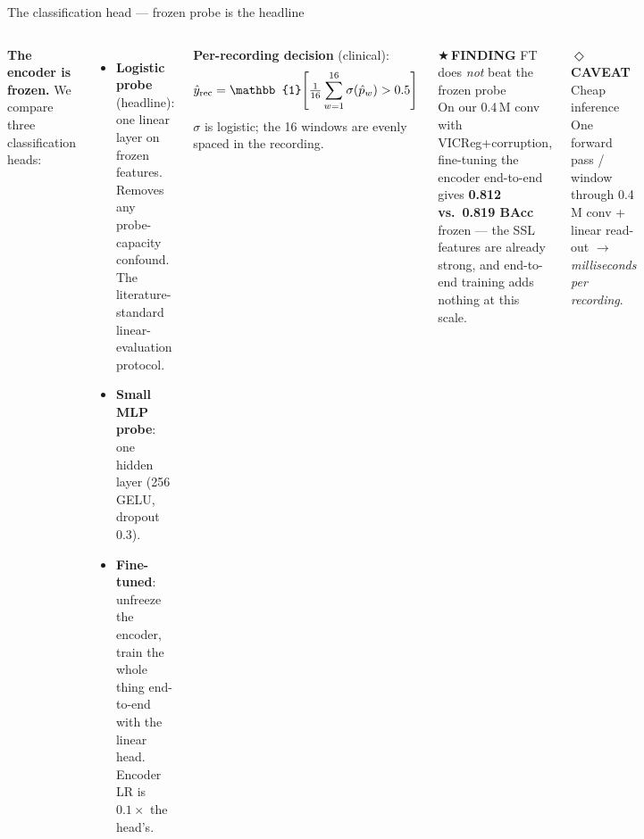 \documentclass[aspectratio=169,11pt]{beamer}
\newcommand{\caveattag}{\textcolor{tplred}{\scriptsize\sffamily\bfseries$\Diamond$\,CAVEAT}\xspace}
\newcommand{\findingtag}{\textcolor{tplgold}{\scriptsize\sffamily\bfseries$\bigstar$\,FINDING}\xspace}
\newcommand{\sectionheader}[1]{\renewcommand{\insertsection}{#1}}
\begin{document}
\sectionheader{INFERENCE}
\begin{frame}{The classification head --- frozen probe is the headline}
\begin{columns}[T,onlytextwidth]
\textbf{The encoder is frozen.} We compare three classification heads:
\begin{itemize}\setlength\itemsep{0pt}
\item \textbf{Logistic probe} (headline): one linear layer on frozen features.
      Removes any probe-capacity confound. The literature-standard
      linear-evaluation protocol.
\item \textbf{Small MLP probe}: one hidden layer (256 GELU, dropout 0.3).
\item \textbf{Fine-tuned}: unfreeze the encoder, train the whole thing
      end-to-end with the linear head. Encoder LR is $0.1\times$ the head's.
\end{itemize}

\vspace{0.4em}
\textbf{Per-recording decision} (clinical):
$$\hat{y}_{\rm rec} = \mathbb{1}\!\left[\tfrac{1}{16}\sum_{w=1}^{16}\sigma(\hat{p}_w) > 0.5\right]$$
$\sigma$ is logistic; the 16 windows are evenly spaced in the recording.

\begin{findingbox}\findingtag FT does \emph{not} beat the frozen probe\\[0.3em]
\small On our 0.4\,M conv with VICReg+corruption, fine-tuning the encoder
end-to-end gives \textbf{0.812 vs.\ 0.819 BAcc} frozen --- the SSL features
are already strong, and end-to-end training adds nothing at this scale.
\end{findingbox}

\vspace{0.4em}
\begin{caveatbox}\caveattag Cheap inference\\[0.3em]
\small One forward pass / window through 0.4\,M conv + linear read-out
$\to$ \emph{milliseconds per recording}.
\end{caveatbox}
\end{columns}
\end{frame}
\end{document}
